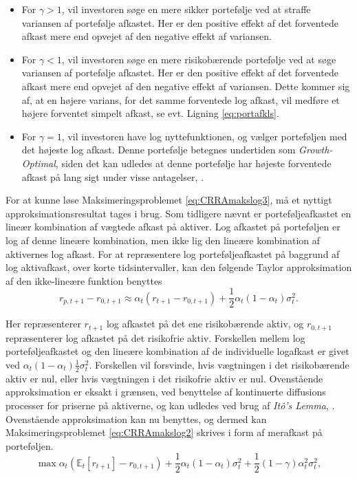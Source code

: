 \documentclass[
  a4paper,
  oneside]{memoir}
\begin{document}
\begin{itemize}
\item
  For \(\gamma>1\), vil investoren søge en mere sikker portefølje ved at straffe variansen af portefølje afkastet. Her er den positive effekt af det forventede afkast mere end opvejet af den negative effekt af variansen.
\item
  For \(\gamma<1\), vil investoren søge en mere risikobærende portefølje ved at søge variansen af portefølje afkastet. Her er den positive effekt af det forventede afkast mere end opvejet af den negative effekt af variansen. Dette kommer sig af, at en højere varians, for det samme forventede log afkast, vil medføre et højere forventet simpelt afkast, se evt. Ligning \eqref{eq:portafkls}.
\item
  For \(\gamma=1\), vil investoren have log nyttefunktionen, og vælger porteføljen med det højeste log afkast. Denne portefølje betegnes undertiden som \emph{Growth-Optimal}, siden det kan udledes at denne portefølje har højeste forventede afkast på lang sigt under visse antagelser, \citep{Kelly1956}.
\end{itemize}

For at kunne løse Maksimeringsproblemet \eqref{eq:CRRAmakslog3}, må et nyttigt approksimationsresultat tages i brug. Som tidligere nævnt er porteføljeafkastet en lineær kombination af vægtede afkast på aktiver. Log afkastet på porteføljen er log af denne lineære kombination, men ikke lig den lineære kombination af aktivernes log afkast. For at repræsentere log porteføljeafkastet på baggrund af log aktivafkast, over korte tidsintervaller, kan den følgende Taylor approksimation af den ikke-lineære funktion benyttes
\[r_{p,t+1}-r_{0,t+1}\approx \alpha_t (r_{t+1}-r_{0,t+1})+\frac{1}{2}\alpha_t(1-\alpha_t)\sigma_t^2.\]

Her repræsenterer \(r_{t+1}\) log afkastet på det ene risikobærende aktiv, og \(r_{0,t+1}\) repræsenterer log afkastet på det risikofrie aktiv. Forskellen mellem log porteføljeafkastet og den lineære kombination af de individuelle logafkast er givet ved \(\alpha_t(1-\alpha_t)\tfrac{1}{2}\sigma_t^2\). Forskellen vil forsvinde, hvis vægtningen i det risikobærende aktiv er nul, eller hvis vægtningen i det risikofrie aktiv er nul. Ovenstående approksimation er eksakt i grænsen, ved benyttelse af kontinuerte diffusions processer for priserne på aktiverne, og kan udledes ved brug af \emph{Itô's Lemma}, \citep{CampVicCha2003}. Ovenstående approksimation kan nu benyttes, og dermed kan Maksimeringsproblemet \eqref{eq:CRRAmakslog2} skrives i form af merafkast på porteføljen.
\begin{equation}
\max\alpha_t(\mathbb{E}_t[r_{t+1}] - r_{0,t+1}) + \frac{1}{2}\alpha_t(1-\alpha_t)\sigma_t^2 + \frac{1}{2}(1-\gamma)\alpha_t^2\sigma_t^2, \label{eq:CRRAmakslog4} 
\end{equation}
\end{document}
